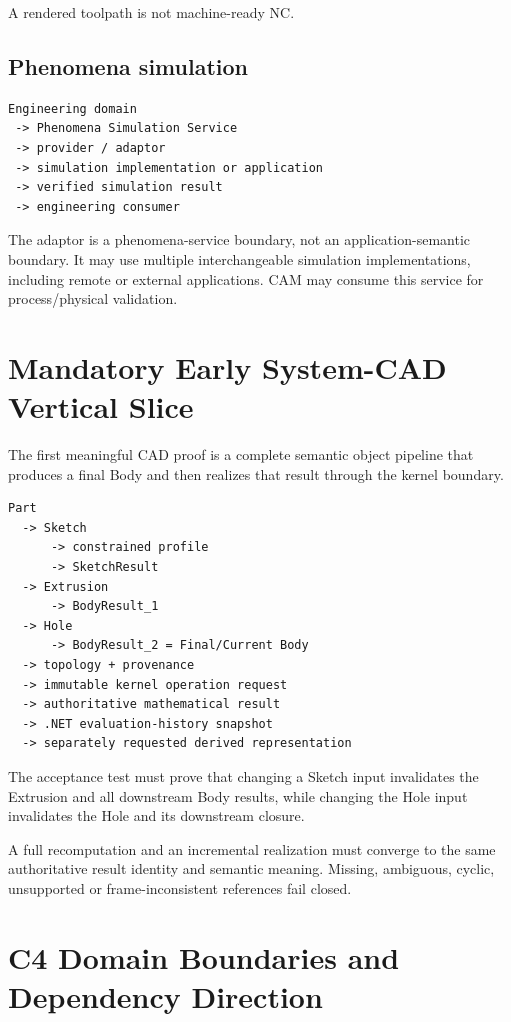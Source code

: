 \documentclass[11pt,a4paper]{report}
\begin{document}
A rendered toolpath is not machine-ready NC.

\section{Phenomena simulation}

\begin{lstlisting}
Engineering domain
 -> Phenomena Simulation Service
 -> provider / adaptor
 -> simulation implementation or application
 -> verified simulation result
 -> engineering consumer
\end{lstlisting}

The adaptor is a phenomena-service boundary, not an application-semantic boundary. It may use multiple interchangeable simulation implementations, including remote or external applications. CAM may consume this service for process/physical validation.

\chapter{Mandatory Early System-CAD Vertical Slice}

The first meaningful CAD proof is a complete semantic object pipeline that produces a final Body and then realizes that result through the kernel boundary.

\begin{lstlisting}
Part
  -> Sketch
      -> constrained profile
      -> SketchResult
  -> Extrusion
      -> BodyResult_1
  -> Hole
      -> BodyResult_2 = Final/Current Body
  -> topology + provenance
  -> immutable kernel operation request
  -> authoritative mathematical result
  -> .NET evaluation-history snapshot
  -> separately requested derived representation
\end{lstlisting}

The acceptance test must prove that changing a Sketch input invalidates the Extrusion and all downstream Body results, while changing the Hole input invalidates the Hole and its downstream closure.

A full recomputation and an incremental realization must converge to the same authoritative result identity and semantic meaning. Missing, ambiguous, cyclic, unsupported or frame-inconsistent references fail closed.

\chapter{C4 Domain Boundaries and Dependency Direction}
\end{document}
